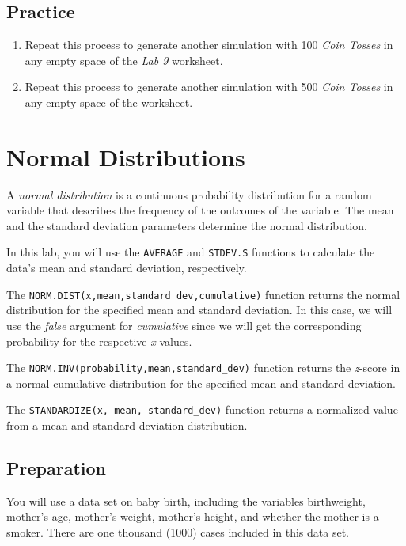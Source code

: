 \documentclass[
]{book}
\providecommand{\tightlist}{%
  \setlength{\itemsep}{0pt}\setlength{\parskip}{0pt}}
\begin{document}
\hypertarget{practice-8}{%
\section{Practice}\label{practice-8}}

\begin{enumerate}
\def\labelenumi{\arabic{enumi}.}
\tightlist
\item
  Repeat this process to generate another simulation with 100 \emph{Coin Tosses} in any empty space of the \emph{Lab 9} worksheet.
\item
  Repeat this process to generate another simulation with 500 \emph{Coin Tosses} in any empty space of the worksheet.
\end{enumerate}

\hypertarget{normal-distributions}{%
\chapter{Normal Distributions}\label{normal-distributions}}

A \emph{normal distribution} is a continuous probability distribution for a random variable that describes the frequency of the outcomes of the variable. The mean and the standard deviation parameters determine the normal distribution.

In this lab, you will use the \texttt{AVERAGE} and \texttt{STDEV.S} functions to calculate the data's mean and standard deviation, respectively.

The \texttt{NORM.DIST(x,mean,standard\_dev,cumulative)} function returns the normal distribution for the specified mean and standard deviation. In this case, we will use the \emph{false} argument for \emph{cumulative} since we will get the corresponding probability for the respective \emph{x} values.

The \texttt{NORM.INV(probability,mean,standard\_dev)} function returns the \emph{z}-score in a normal cumulative distribution for the specified mean and standard deviation.

The \texttt{STANDARDIZE(x,\ mean,\ standard\_dev)} function returns a normalized value from a mean and standard deviation distribution.

\hypertarget{preparation-7}{%
\section{Preparation}\label{preparation-7}}

You will use a data set on baby birth, including the variables birthweight, mother's age, mother's weight, mother's height, and whether the mother is a smoker. There are one thousand (1000) cases included in this data set.
\end{document}
